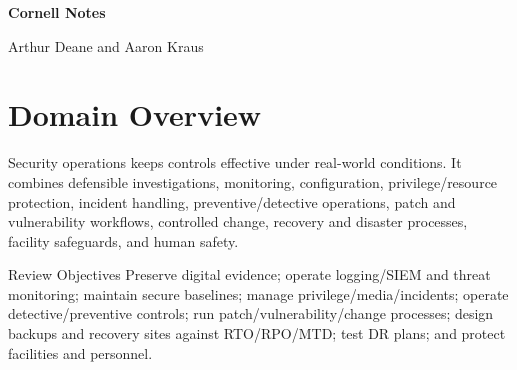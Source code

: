 \documentclass[10pt,letterpaper]{article}
\begin{document}
\hypersetup{pageanchor=false}
\begin{titlepage}\pagecolor{navy}\color{white}\vspace{0.25in}{\large Sixth Edition \textbullet\ 2021\par}\vfill{\Huge\bfseries Cornell Notes\par}\vspace{0.25in}{\LARGE Domain 7\par}\vspace{0.08in}{\LARGE\bfseries Security Operations\par}\vfill{\large Arthur Deane and Aaron Kraus\par}\vspace{0.12in}{\normalsize Study and review companion\par}\end{titlepage}
\hypersetup{pageanchor=true}\nopagecolor\color{black}

\section*{\color{navy}Domain Overview}
Security operations keeps controls effective under real-world conditions. It combines defensible investigations, monitoring, configuration, privilege/resource protection, incident handling, preventive/detective operations, patch and vulnerability workflows, controlled change, recovery and disaster processes, facility safeguards, and human safety.

\begin{summarybox}{Review Objectives}
Preserve digital evidence; operate logging/SIEM and threat monitoring; maintain secure baselines; manage privilege/media/incidents; operate detective/preventive controls; run patch/vulnerability/change processes; design backups and recovery sites against RTO/RPO/MTD; test DR plans; and protect facilities and personnel.
\end{summarybox}
\end{document}
